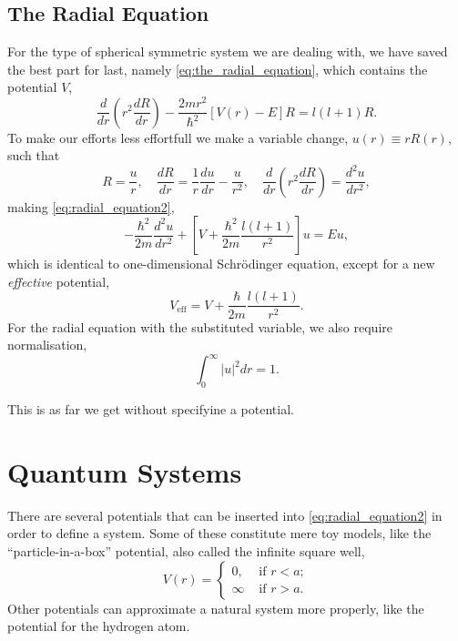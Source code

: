 \subsection{The Radial Equation}

For the type of spherical symmetric system we are dealing with, we have 
saved the best part for last, namely \autoref{eq:the_radial_equation},
which contains the potential $V$,
\begin{equation}
    \label{eq:radial_equation2}
    \frac{d}{dr}\left(r^2\frac{dR}{dr} \right)
    -
    \frac{2mr^2}{\hbar^2} [V(r) - E]R
    =
    l(l + 1)R.
\end{equation}
To make our efforts less effortfull we make a variable change, $u(r) \equiv r R(r)$,
such that 
\begin{equation*}
    R = \frac{u}{r}, \quad
    \frac{dR}{dr} = \frac{1}{r}\frac{du}{dr} - \frac{u}{r^2}, \quad 
    \frac{d}{dr}\left(r^2 \frac{dR}{dr} \right)
        = \frac{d^2u}{dr^2},
\end{equation*}
making \autoref{eq:radial_equation2},
\begin{equation}
    - \frac{\hbar^2}{2m}\frac{d^2u}{dr^2}
    +
    \left[
        V + \frac{\hbar^2}{2m}\frac{l(l + 1)}{r^2} 
    \right]
    u = Eu,
\end{equation}
which is identical to one-dimensional Schrödinger equation, except for 
a new \emph{effective} potential,
\begin{equation}
    V_\text{eff} = V + \frac{\hbar}{2m}\frac{l(l + 1)}{r^2}.
\end{equation}
For the radial equation with the substituted variable, we also require normalisation,
\begin{equation} 
    \int_0^\infty |u|^2 dr = 1.
\end{equation}

This is as far we get without specifyine a potential. 

\section{Quantum Systems}

There are several potentials that can be inserted into \autoref{eq:radial_equation2}
in order to define a system. Some of these constitute mere toy models, like 
the ``particle-in-a-box'' potential, also called the infinite square well,
\begin{equation}
    V(r) = \begin{cases}
        0,      &\text{ if } r < a;\\
        \infty  &\text{ if } r > a.
    \end{cases} 
 \end{equation}
Other potentials can approximate a natural system more properly,
like the potential for the hydrogen atom.

